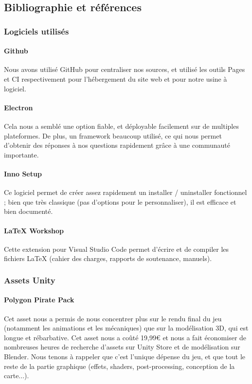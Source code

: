 \subsection{Bibliographie et références}

    \subsubsection{Logiciels utilisés}

    
        \paragraph{Github} Nous avons utilisé GitHub pour centraliser nos sources, et utilisé les outils Pages et CI respectivement 
        pour l'hébergement du site web et pour notre usine à logiciel.

        \paragraph{Electron} Cela nous a semblé une option fiable, et déployable facilement sur de multiples plateformes. De plus, 
        un framework beaucoup utilisé, ce qui nous permet d'obtenir des réponses à nos questions rapidement grâce à une communauté importante.

        \paragraph{Inno Setup} Ce logiciel permet de créer assez rapidement un installer / uninstaller fonctionnel ; bien que très classique 
        (pas d'options pour le personnaliser), il est efficace et bien documenté.

        \paragraph{LaTeX Workshop} Cette extension pour Visual Studio Code permet d'écrire et de compiler les fichiers LaTeX (cahier des charges, 
        rapports de soutenance, manuels).

    \subsubsection{Assets Unity}


        \paragraph{Polygon Pirate Pack} Cet asset nous a permis de nous concentrer plus sur le rendu final du jeu (notamment 
        les animations et les mécaniques) que sur la modélisation 3D, qui est longue et rébarbative. Cet asset nous a coûté 19,99€ 
        et nous a fait économiser de nombreuses heures de recherche d'assets sur Unity Store et de modélisation sur Blender. 
        Nous tenons à rappeler que c'est l'unique dépense du jeu, et que tout le reste de la partie graphique (effets, shaders,  
        post-processing, conception de la carte...).

